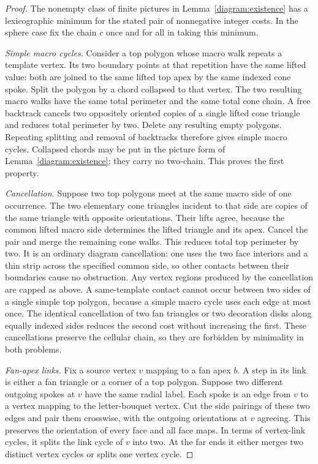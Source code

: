 \begin{proof}
The nonempty class of finite pictures in
Lemma~\ref{diagram:existence} has a lexicographic minimum for the stated
pair of nonnegative integer costs.  In the sphere case fix the chain
$c$ once and for all in taking this minimum.

\emph{Simple macro cycles.}  Consider a top polygon whose macro walk repeats a template
vertex.  Its two boundary points at that repetition have the same
lifted value: both are joined to the same lifted top apex by the same
indexed cone spoke.  Split the polygon by a chord collapsed to that
vertex.  The two resulting macro walks have the same total perimeter
and the same total cone chain.  A free backtrack cancels two oppositely
oriented copies of a single lifted cone triangle and reduces total
perimeter by two.  Delete any resulting empty polygons.  Repeating
splitting and removal of backtracks therefore gives simple macro
cycles.  Collapsed chords may be put in
the picture form of Lemma~\ref{diagram:existence}; they carry no
two-chain.  This proves the first property.

\emph{Cancellation.}  Suppose two top polygons meet at the same
macro side of one occurrence.  The two elementary cone triangles
incident to that side are copies of the same triangle with opposite
orientations.  Their lifts agree, because the common lifted macro side
determines the lifted triangle and its apex.  Cancel the pair and
merge the remaining cone walks.  This reduces total top perimeter by
two.  It is an ordinary diagram cancellation: one uses the two face
interiors and a thin strip across the specified common side, so other
contacts between their boundaries cause no obstruction.  Any vertex
regions produced by the cancellation are capped as above.  A
same-template contact cannot occur between two sides of a single
simple top polygon, because a simple macro cycle uses each edge at
most once.  The identical cancellation of two fan triangles or two
decoration disks along equally indexed sides reduces the second cost
without increasing the first.  These cancellations preserve the
cellular chain, so they are forbidden by minimality in both problems.

\emph{Fan-apex links.}  Fix a source vertex $v$
mapping to a fan apex $b$.  A step in its link is either a fan triangle
or a corner of a top polygon.  Suppose two different outgoing spokes
at $v$ have the same radial label.  Each spoke is an edge from $v$ to a
vertex mapping to the letter-bouquet vertex.  Cut the side pairings of
these two edges and pair them crosswise, with the outgoing orientations
at $v$ agreeing.  This preserves the orientation of every face and all
face maps.  In terms of vertex-link cycles, it splits the link cycle of
$v$ into two.  At the far ends it either merges two distinct vertex
cycles or splits one vertex cycle.


\end{proof}
